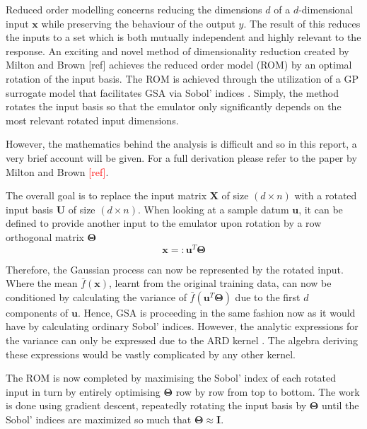 \documentclass[preprint,12pt]{elsarticle}
\newcommand*{\M}[1]{\ensuremath{#1}\xspace}
\newcommand*{\vr}[1]{\M{\mathbf{#1}}}
\begin{document}
	Reduced order modelling concerns reducing the dimensions $d$ of a $d$-dimensional input $\vr{x}$ while preserving the behaviour of the output $y$. The result of this reduces the inputs to a set which is both mutually independent and highly relevant to the response. An exciting and novel method of dimensionality reduction created by Milton and Brown [ref] achieves the reduced order model (ROM) by an optimal rotation of the input basis. The ROM is achieved through the utilization of a GP surrogate model that facilitates GSA via Sobol' indices \cite{Sobol2001}. Simply, the method rotates the input basis so that the emulator only significantly depends on the most relevant rotated input dimensions. 
	
	However, the mathematics behind the analysis is difficult and so in this report, a very brief account will be given. For a full derivation please refer to the paper by Milton and Brown \textcolor{red}{[ref]}.
	
	The overall goal is to replace the input matrix $\vr{X}$ of size $(d\times n)$ with a rotated input basis $\vr{U}$ of size $(d\times n)$. When looking at a sample datum $\vr{u}$, it can be defined to provide another input to the emulator upon rotation by a row orthogonal matrix $\vr{\Theta}$
	\begin{equation}
	\label{Eq:ROM_Rotation}
	\vr{x} =: \vr{u}^T \vr{\Theta}
	\end{equation}
	
	Therefore, the Gaussian process can now be represented by the rotated input. Where the mean $\bar{f}(\vr{x})$, learnt from the original training data, can now be conditioned by calculating the variance of $\bar{f}(\vr{u}^T \vr{\Theta})$ due to the first $d$ components of $\vr{u}$. Hence, GSA is proceeding in the same fashion now as it would have by calculating ordinary Sobol' indices. However, the analytic expressions for the variance can only be expressed due to the ARD kernel \cite{Wipf2007}. The algebra deriving these expressions would be vastly complicated by any other kernel.
	
	The ROM is now completed by maximising the Sobol' index of each rotated input in turn by entirely optimising $\vr{\Theta}$ row by row from top to bottom. The work is done using gradient descent, repeatedly rotating the input basis by $\vr{\Theta}$ until the Sobol' indices are maximized so much that $\vr{\Theta} \approx \vr{I}$.
	
\end{document}
